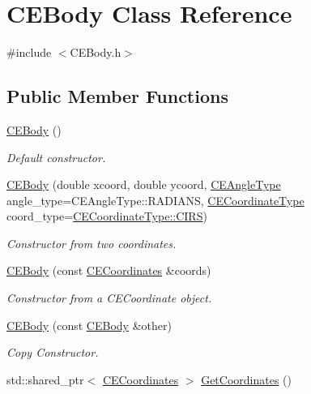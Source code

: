 \hypertarget{class_c_e_body}{}\section{C\+E\+Body Class Reference}
\label{class_c_e_body}


{\ttfamily \#include $<$C\+E\+Body.\+h$>$}

\subsection*{Public Member Functions}
\begin{DoxyCompactItemize}
\item 
\hyperlink{class_c_e_body_abd36081ccb5770d61e2da22e3f50d552}{C\+E\+Body} ()
\begin{DoxyCompactList}\small\item\em Default constructor. \end{DoxyCompactList}\item 
\hyperlink{class_c_e_body_ab0b96cb0cd4b2f04ba8969dc2b88fb82}{C\+E\+Body} (double xcoord, double ycoord, \hyperlink{namespace_cpp_ephem_a9a974f6ccf329e8cb5f9208b725f15ef}{C\+E\+Angle\+Type} angle\+\_\+type=C\+E\+Angle\+Type\+::\+R\+A\+D\+I\+A\+N\+S, \hyperlink{_c_e_coordinates_8h_a2198dc50406b64707964f5c1e8b32db2}{C\+E\+Coordinate\+Type} coord\+\_\+type=\hyperlink{_c_e_coordinates_8h_a2198dc50406b64707964f5c1e8b32db2a4efe390156f8c58bfa109575fc5cae4c}{C\+E\+Coordinate\+Type\+::\+C\+I\+R\+S})
\begin{DoxyCompactList}\small\item\em Constructor from two coordinates. \end{DoxyCompactList}\item 
\hyperlink{class_c_e_body_ae37bba2077f7f3a1ed933e8ad6dd24bf}{C\+E\+Body} (const \hyperlink{class_c_e_coordinates}{C\+E\+Coordinates} \&coords)
\begin{DoxyCompactList}\small\item\em Constructor from a C\+E\+Coordinate object. \end{DoxyCompactList}\item 
\hyperlink{class_c_e_body_ac8bcbe8f5c0fd548e5473de324add4a9}{C\+E\+Body} (const \hyperlink{class_c_e_body}{C\+E\+Body} \&other)
\begin{DoxyCompactList}\small\item\em Copy Constructor. \end{DoxyCompactList}\item 
std\+::shared\+\_\+ptr$<$ \hyperlink{class_c_e_coordinates}{C\+E\+Coordinates} $>$ \hyperlink{class_c_e_body_afb139f461d8df01692deb6e9b90e69e1}{Get\+Coordinates} ()

\end{DoxyCompactItemize}

